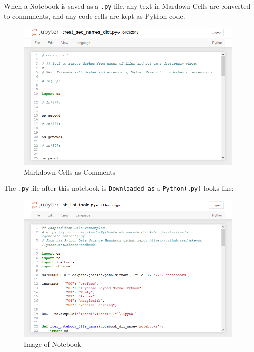 \documentclass{book}
\makeatletter
\def\maxwidth{\ifdim\Gin@nat@width>\linewidth\linewidth
    \else\Gin@nat@width\fi}
\let\Oldincludegraphics\includegraphics
\renewcommand{\includegraphics}[1]{\Oldincludegraphics[width=.8\maxwidth]{#1}}
\makeatother
\begin{document}
When a Notebook is saved as a \lstinline!.py! file, any text in Mardown
Cells are converted to commments, and any code cells are kept as Python
code.

\begin{figure}
\centering
\includegraphics{images/jupyter_notebook_markdown_cells_as_comments.png}
\caption{Markdown Cells as Comments}
\end{figure}

The \lstinline!.py! file after this notebook is
\lstinline!Downloaded as! a \lstinline!Python(.py)! looks like:

\begin{figure}
\centering
\includegraphics{images/jupyter_notebook_dot_py_file.png}
\caption{Image of Notebook}
\end{figure}
    
\end{document}
